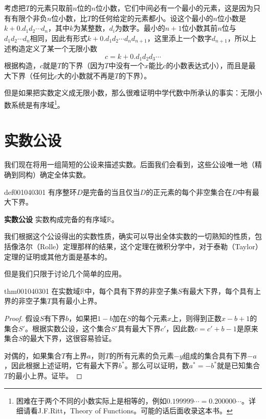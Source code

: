 考虑把$T$的元素只取前$n$位的$n$位小数，它们中间必有一个最小的元素，这是因为只有有限个非负$n$位小数，比$T$的任何给定的元素都小。设这个最小的$n$位小数是$k+0.d_1d_2\cdots{}d_n$，其中$k$为某整数，$d_i$为数字。最小的$n+1$位小数其前$n$位与$d_1d_2\cdots{}d_n$相同，因此有形式$k+0.d_1d_2\cdots{}d_nd_{n+1}$，这里添上一个数字$d_{n+1}$，所以上述构造定义了某一个无限小数
\[
c = k + 0.d_1d_2d_3\cdots
\]
根据构造，$c$就是$T$的下界（因为$T$中没有一个$x$能比$c$的小数表达式小），而且是最大下界（任何比$c$大的小数就不再是$T$的下界）。

但是如果把实数定义成无限小数，那么很难证明中学代数中所承认的事实：无限小数系统是有序域\footnote{困难在于两个不同的小数实际上是相等的，例如$0.199999\cdots=0.200000\cdots$。详细请看J.F.Ritt，Theory of Functions。可能的话后面收录这本书。}。



\section{实数公设}\label{subsection0010403}
我们现在将用一组简短的公设来描述实数。后面我们会看到，这些公设唯一地（精确到同构）确定全体实数。

\begin{definition}{}{def001040301}
有序整环$D$是完备的当且仅当$D$的正元素的每个非空集合在$D$中有最大下界。
\end{definition}

\textbf{实数公设} \quad 实数构成完备的有序域$\mathbb{R}$。

我们根据这个公设得出的实数性质，确实可以导出全体实数的一切熟知的性质，包括像洛尔（Rolle）定理那样的结果，这个定理在微积分学中，对于泰勒（Taylor）定理的证明或其他方面是基本的。

但是我们只限于讨论几个简单的应用。
\begin{theorem}{}{thm001040301}
在实数域$\mathbb{R}$中，每个具有下界的非空子集$S$有最大下界，每个具有上界的非空子集$T$具有最小上界。
\end{theorem}

\begin{proof}
假设$S$有下界$b$，如果把$1-b$加在$S$的每个元素$x$上，则得到正数$x-b+1$的集合$S'$。根据实数公设，这个集合$S'$具有最大下界$c'$，因此数$c=c'+b-1$是原来集合$S$的最大下界，这很容易验证。

对偶的，如果集合$T$有上界$a$，则$T$的所有元素的负元素$-y$组成的集合具有下界$-a$，因此根据上述证明，它有最大下界$b^*$。那么可以证明，数$a^*=-b^*$就是已知集合$T$的最小上界。证毕。
\end{proof}


